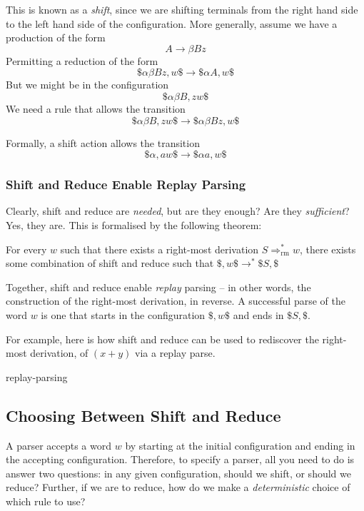 This is known as a \textit{shift}, since we are shifting terminals from the right hand side to the left hand side of the configuration. More generally, assume we have a production of the form 
\[ A \rightarrow \beta B z\]
Permitting a reduction of the form
\[\$ \alpha \beta B z, w \$ \longrightarrow \$ \alpha A, w \$ \]
But we might be in the configuration
\[\$ \alpha \beta B, zw \$ \]
We need a rule that allows the transition
\[ \$\alpha \beta B, zw \$ \longrightarrow \$\alpha \beta B z, w\$\]

Formally, a shift action allows the transition
\[ \$\alpha, aw \$ \longrightarrow \$\alpha a, w \$\]

\subsubsection{Shift and Reduce Enable Replay Parsing}
Clearly, shift and reduce are \textit{needed}, but are they enough? Are they \textit{sufficient}? Yes, they are. This is formalised by the following theorem:

\begin{theorem}
    For every $w$ such that there exists a right-most derivation $S \Rightarrow^{*}_\text{rm} w$, there exists some combination of shift and reduce such that $\$, w\$ \rightarrow^{*} \$S, \$$
\end{theorem}

Together, shift and reduce enable \textit{replay} parsing -- in other words, the construction of the right-most derivation, in reverse. A successful parse of the word $w$ is one that starts in the configuration $\$, w\$$ and ends in $\$S, \$$.

For example, here is how shift and reduce can be used to rediscover the right-most derivation, of $(x+y)$ via a replay parse.

\begin{center}
    {replay-parsing}
\end{center}


\subsection{Choosing Between Shift and Reduce}\label{section:lr-lr0-items}
A parser accepts a word $w$ by starting at the initial configuration and ending in the accepting configuration. Therefore, to specify a parser, all you need to do is answer two questions: in any given configuration, should we shift, or should we reduce? Further, if we are to reduce, how do we make a \textit{deterministic} choice of which rule to use?

